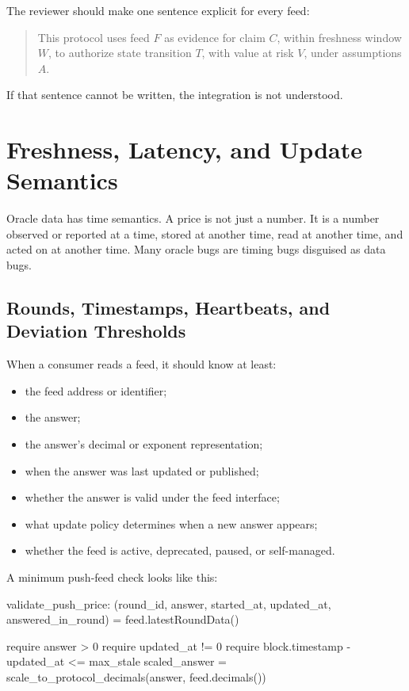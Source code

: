 The reviewer should make one sentence explicit for every feed:

\begin{quote}
This protocol uses feed \(F\) as evidence for claim \(C\), within freshness window \(W\), to authorize state transition \(T\), with value at risk \(V\), under assumptions \(A\).
\end{quote}

If that sentence cannot be written, the integration is not understood.

\section{Freshness, Latency, and Update Semantics}

Oracle data has time semantics. A price is not just a number. It is a number observed or reported at a time, stored at another time, read at another time, and acted on at another time. Many oracle bugs are timing bugs disguised as data bugs.

\subsection{Rounds, Timestamps, Heartbeats, and Deviation Thresholds}

When a consumer reads a feed, it should know at least:

\begin{itemize}
\item the feed address or identifier;
\item the answer;
\item the answer's decimal or exponent representation;
\item when the answer was last updated or published;
\item whether the answer is valid under the feed interface;
\item what update policy determines when a new answer appears;
\item whether the feed is active, deprecated, paused, or self-managed.
\end{itemize}

A minimum push-feed check looks like this:

\begin{codeblock}
validate_push_price:
    (round_id, answer, started_at, updated_at, answered_in_round) =
        feed.latestRoundData()

    require answer > 0
    require updated_at != 0
    require block.timestamp - updated_at <= max_stale
    scaled_answer = scale_to_protocol_decimals(answer, feed.decimals())
\end{codeblock}

